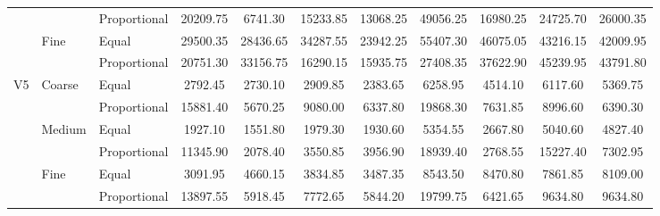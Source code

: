 \documentclass[10pt,journal,compsoc]{IEEEtran}
\begin{document}
\begin{table}
\begin{tabular}{|c|l|l|c|c|c|c|c|c|c|c|}
	& 	& Proportional	& 20209.75	& 6741.30	& 15233.85	& 13068.25	& 49056.25	& 16980.25	& 24725.70	& 26000.35	 \\ \cline{2-11}
	& Fine	& Equal	& 29500.35	& 28436.65	& 34287.55	& 23942.25	& 55407.30	& 46075.05	& 43216.15	& 42009.95	 \\ \cline{3-11}
	& 	& Proportional	& 20751.30	& 33156.75	& 16290.15	& 15935.75	& 27408.35	& 37622.90	& 45239.95	& 43791.80	 \\ \hline
V5	& Coarse	& Equal	& 2792.45	& 2730.10	& 2909.85	& 2383.65	& 6258.95	& 4514.10	& 6117.60	& 5369.75	 \\ \cline{3-11}
	& 	& Proportional	& 15881.40	& 5670.25	& 9080.00	& 6337.80	& 19868.30	& 7631.85	& 8996.60	& 6390.30	 \\ \cline{2-11}
	& Medium	& Equal	& 1927.10	& 1551.80	& 1979.30	& 1930.60	& 5354.55	& 2667.80	& 5040.60	& 4827.40	 \\ \cline{3-11}
	& 	& Proportional	& 11345.90	& 2078.40	& 3550.85	& 3956.90	& 18939.40	& 2768.55	& 15227.40	& 7302.95	 \\ \cline{2-11}
	& Fine	& Equal	& 3091.95	& 4660.15	& 3834.85	& 3487.35	& 8543.50	& 8470.80	& 7861.85	& 8109.00	 \\ \cline{3-11}
	& 	& Proportional	& 13897.55	& 5918.45	& 7772.65	& 5844.20	& 19799.75	& 6421.65	& 9634.80	& 9634.80	 \\ \hline
\end{tabular}
\end{table}
\end{document}
